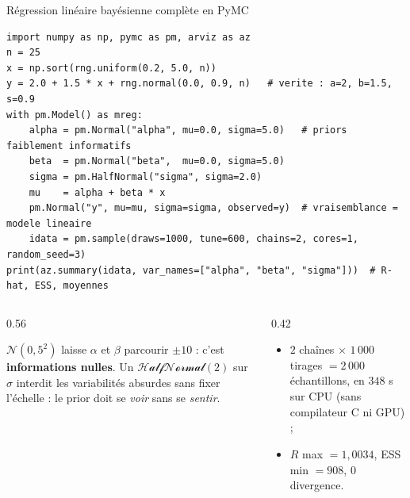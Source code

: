 \begin{frame}[fragile]{Régression linéaire bayésienne complète en PyMC}
\footnotesize
\vspace{-2.5mm}
\begin{codebox}
\begin{lstlisting}
import numpy as np, pymc as pm, arviz as az
n = 25
x = np.sort(rng.uniform(0.2, 5.0, n))
y = 2.0 + 1.5 * x + rng.normal(0.0, 0.9, n)   # verite : a=2, b=1.5, s=0.9
with pm.Model() as mreg:
    alpha = pm.Normal("alpha", mu=0.0, sigma=5.0)   # priors faiblement informatifs
    beta  = pm.Normal("beta",  mu=0.0, sigma=5.0)
    sigma = pm.HalfNormal("sigma", sigma=2.0)
    mu    = alpha + beta * x
    pm.Normal("y", mu=mu, sigma=sigma, observed=y)  # vraisemblance = modele lineaire
    idata = pm.sample(draws=1000, tune=600, chains=2, cores=1, random_seed=3)
print(az.summary(idata, var_names=["alpha", "beta", "sigma"]))  # R-hat, ESS, moyennes
\end{lstlisting}
\end{codebox}
\vspace{0.5mm}
\begin{columns}[t]
\begin{column}{0.56\textwidth}
\begin{kbox}
$\mathcal{N}(0, 5^2)$ laisse $\alpha$ et $\beta$ parcourir $\pm 10$ : c'est
\textbf{informations nulles}. Un $\mathcal{HalfNormal}(2)$ sur $\sigma$ interdit
les variabilités absurdes sans fixer l'échelle : le prior doit se \emph{voir}
sans se \emph{sentir}.
\end{kbox}
\end{column}
\begin{column}{0.42\textwidth}
\begin{solbox}
\begin{itemize}
  \item $2$ chaînes $\times$ $1\,000$ tirages $= 2\,000$ échantillons, en $348$ s
        sur CPU (sans compilateur C ni GPU) ;
  \item $\hat R$ max $= 1{,}0034$, ESS min $= 908$, $0$ divergence.
\end{itemize}
\end{solbox}
\end{column}
\end{columns}
\end{frame}


